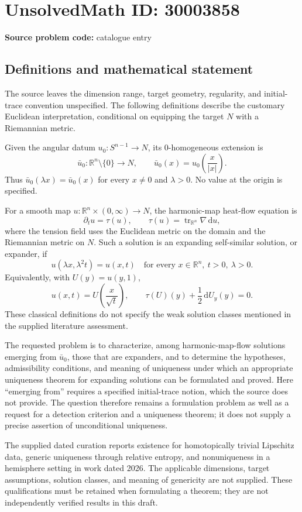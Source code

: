 \documentclass[11pt]{article}
\newcommand{\R}{\mathbb{R}}
\newcommand{\dd}{\,\mathrm{d}}
\begin{document}
\section*{UnsolvedMath ID: 30003858}
\textbf{Source problem code:} catalogue entry
\subsection{Definitions and mathematical statement}
The source leaves the dimension range, target geometry, regularity, and initial-trace convention unspecified. The following definitions describe the customary Euclidean interpretation, conditional on equipping the target \(N\) with a Riemannian metric.

Given the angular datum \(u_0:S^{n-1}\to N\), its \(0\)-homogeneous extension is
\[
\bar u_0:\R^n\setminus\{0\}\to N,\qquad
\bar u_0(x)=u_0\!\left(\frac{x}{|x|}\right).
\]
Thus \(\bar u_0(\lambda x)=\bar u_0(x)\) for every \(x\ne0\) and \(\lambda>0\). No value at the origin is specified.

For a smooth map \(u:\R^n\times(0,\infty)\to N\), the harmonic-map heat-flow equation is
\[
\partial_tu=\tau(u),\qquad
\tau(u)=\operatorname{tr}_{\R^n}\nabla\dd u,
\]
where the tension field uses the Euclidean metric on the domain and the Riemannian metric on \(N\). Such a solution is an expanding self-similar solution, or expander, if
\[
u(\lambda x,\lambda^2t)=u(x,t)
\quad\text{for every }x\in\R^n,\ t>0,\ \lambda>0.
\]
Equivalently, with \(U(y)=u(y,1)\),
\[
u(x,t)=U\!\left(\frac{x}{\sqrt t}\right),
\qquad
\tau(U)(y)+\frac12\dd U_y(y)=0.
\]
These classical definitions do not specify the weak solution classes mentioned in the supplied literature assessment.

The requested problem is to characterize, among harmonic-map-flow solutions emerging from \(\bar u_0\), those that are expanders, and to determine the hypotheses, admissibility conditions, and meaning of uniqueness under which an appropriate uniqueness theorem for expanding solutions can be formulated and proved. Here ``emerging from'' requires a specified initial-trace notion, which the source does not provide. The question therefore remains a formulation problem as well as a request for a detection criterion and a uniqueness theorem; it does not supply a precise assertion of unconditional uniqueness.

The supplied dated curation reports existence for homotopically trivial Lipschitz data, generic uniqueness through relative entropy, and nonuniqueness in a hemisphere setting in work dated 2026. The applicable dimensions, target assumptions, solution classes, and meaning of genericity are not supplied. These qualifications must be retained when formulating a theorem; they are not independently verified results in this draft.
\end{document}
